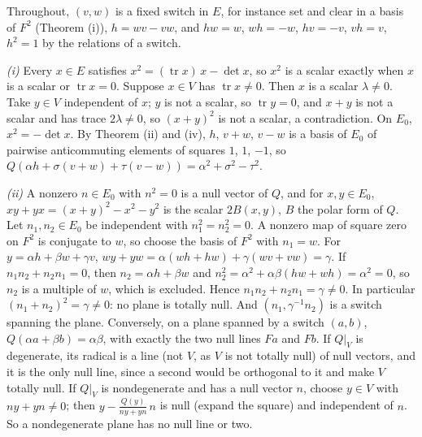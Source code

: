 Throughout, $(v, w)$ is a fixed switch in $E$, for instance set and clear in a basis of $F^{2}$ (Theorem (i)), $h = wv - vw$, and $hw = w$, $wh = -w$, $hv = -v$, $vh = v$, $h^{2} = 1$ by the relations of a switch.

\emph{(i)} Every $x \in E$ satisfies $x^{2} = (\operatorname{tr}x)\,x - \det x$, so $x^{2}$ is a scalar exactly when $x$ is a scalar or $\operatorname{tr}x = 0$. Suppose $x \in V$ has $\operatorname{tr}x \ne 0$. Then $x$ is a scalar $\lambda \ne 0$. Take $y \in V$ independent of $x$; $y$ is not a scalar, so $\operatorname{tr}y = 0$, and $x + y$ is not a scalar and has trace $2\lambda \ne 0$, so $(x + y)^{2}$ is not a scalar, a contradiction. On $E_{0}$, $x^{2} = -\det x$. By Theorem (ii) and (iv), $h$, $v + w$, $v - w$ is a basis of $E_{0}$ of pairwise anticommuting elements of squares $1$, $1$, $-1$, so $Q(\alpha h + \sigma(v + w) + \tau(v - w)) = \alpha^{2} + \sigma^{2} - \tau^{2}$.

\emph{(ii)} A nonzero $n \in E_{0}$ with $n^{2} = 0$ is a null vector of $Q$, and for $x, y \in E_{0}$, $xy + yx = (x + y)^{2} - x^{2} - y^{2}$ is the scalar $2B(x,y)$, $B$ the polar form of $Q$. Let $n_{1}, n_{2} \in E_{0}$ be independent with $n_{1}^{2} = n_{2}^{2} = 0$. A nonzero map of square zero on $F^{2}$ is conjugate to $w$, so choose the basis of $F^{2}$ with $n_{1} = w$. For $y = \alpha h + \beta w + \gamma v$, $wy + yw = \alpha(wh + hw) + \gamma(wv + vw) = \gamma$. If $n_{1}n_{2} + n_{2}n_{1} = 0$, then $n_{2} = \alpha h + \beta w$ and $n_{2}^{2} = \alpha^{2} + \alpha\beta(hw + wh) = \alpha^{2} = 0$, so $n_{2}$ is a multiple of $w$, which is excluded. Hence $n_{1}n_{2} + n_{2}n_{1} = \gamma \ne 0$. In particular $(n_{1} + n_{2})^{2} = \gamma \ne 0$: no plane is totally null. And $(n_{1}, \gamma^{-1}n_{2})$ is a switch spanning the plane. Conversely, on a plane spanned by a switch $(a, b)$, $Q(\alpha a + \beta b) = \alpha\beta$, with exactly the two null lines $Fa$ and $Fb$. If $Q|_{V}$ is degenerate, its radical is a line (not $V$, as $V$ is not totally null) of null vectors, and it is the only null line, since a second would be orthogonal to it and make $V$ totally null. If $Q|_{V}$ is nondegenerate and has a null vector $n$, choose $y \in V$ with $ny + yn \ne 0$; then $y - \frac{Q(y)}{ny + yn}\,n$ is null (expand the square) and independent of $n$. So a nondegenerate plane has no null line or two.

